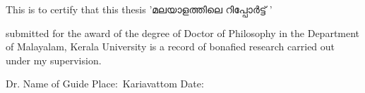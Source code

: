 
\center
\textbf{\LARGE{}}
\vspace{.1in}\newline


\flushleft
{\gentium This is to certify that this thesis} {\gayathri'മലയാളത്തിലെ റിപ്പോർട്ട് '} {\gentium submitted for the award of the degree of Doctor of Philosophy in the Department of Malayalam, Kerala University is a record of bonafied research carried out under my supervision.

\vspace{.5in}
\flushright
Dr. Name of Guide
\flushleft
Place$ :$ Kariavattom
\newline
Date$  :$\hspace*{6.4cm}
}
